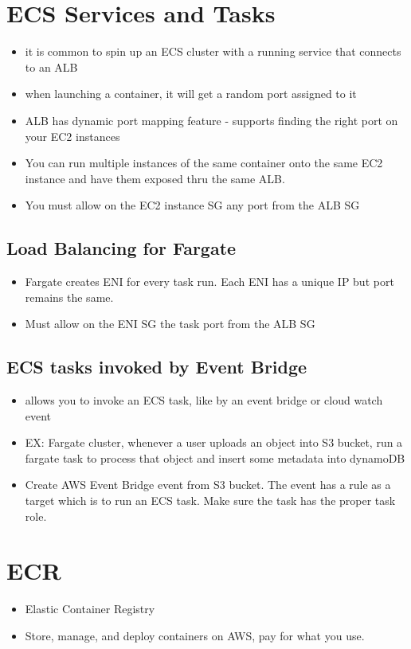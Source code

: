 \documentclass[]{scrartcl}
\begin{document}
\section{ECS Services and Tasks}
\begin{itemize}
	\item it is common to spin up an ECS cluster with a running service that connects to an ALB
	\item when launching a container, it will get a random port assigned to it
	\item ALB has dynamic port mapping feature - supports finding the right port on your EC2 instances
	\item You can run multiple instances of the same container onto the same EC2 instance and have them exposed thru the same ALB. 
	\item You must allow on the EC2 instance SG any port from the ALB SG
\end{itemize}

\subsection{Load Balancing for Fargate}
\begin{itemize}
	\item Fargate creates ENI for every task run. Each ENI has a unique IP but port remains the same. 
	\item Must allow on the ENI SG the task port from the ALB SG
\end{itemize}

\subsection{ECS tasks invoked by Event Bridge}
\begin{itemize}
	\item allows you to invoke an ECS task, like by an event bridge or cloud watch event
	\item EX: Fargate cluster, whenever a user uploads an object into S3 bucket, run a fargate task to process that object and insert some metadata into dynamoDB
	\item Create AWS Event Bridge event from S3 bucket. The event has a rule as a target which is to run an ECS task. Make sure the task has the proper task role. 
\end{itemize}

\section{ECR}
\begin{itemize}
	\item Elastic Container Registry
	\item Store, manage, and deploy containers on AWS, pay for what you use. 
\end{itemize}
\end{document}

